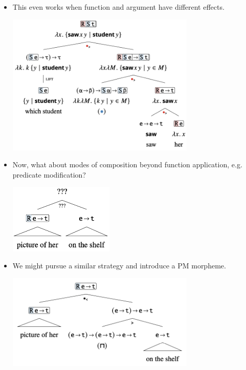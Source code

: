 \documentclass{article}
\begin{document}
\begin{itemize}
\begin{exe}
\begin{center}
      \end{center}
  \end{exe}
  \item This even works when function and argument have different effects.
  \begin{exe}
    \ex \label{13} \hfill
      \begin{center}
        \includegraphics[width=9cm]{clips/13.png}
      \end{center}
  \end{exe}
  \item Now, what about modes of composition beyond function application, e.g. predicate modification?
  \begin{exe}
    \ex \label{14} \hfill
      \begin{center}
        \includegraphics[width=5cm]{clips/14.png}
      \end{center}
  \end{exe}
  \item We might pursue a similar strategy and introduce a PM morpheme.
  \begin{exe}
    \ex \label{15} \hfill
      \begin{center}
        \includegraphics[width=9cm]{clips/15.png}

\end{center}
\end{exe}
\end{itemize}
\end{document}
